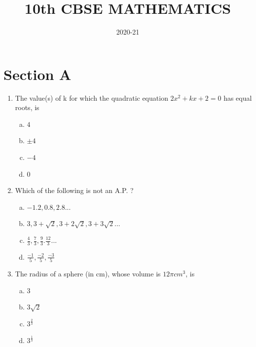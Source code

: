 \documentclass[journal,12pt,twocolumn]{IEEEtran}
\title{10th CBSE MATHEMATICS}
\author{2020-21}
\begin{document}
\maketitle
\newpage
\bigskip
\section{Section A}
\begin{enumerate}[label=1.\arabic*]

\item The value(s) of k for which the quadratic equation $2x^2 + kx + 2 = 0$ has equal roots, is\\
\begin{enumerate}[(a)]
    \item $4$\\
    \item $\pm 4$\\
    \item $- 4$\\
    \item $0$\\
\end{enumerate}

\item Which of the following is not an A.P. ?\\
\begin{enumerate}[(a)]
    \item $-1.2, 0.8, 2.8...$\\
    \item $3, 3 + \sqrt{2}, 3 + 2\sqrt{2},3 + 3\sqrt{2}...$\\ 
    \item $\frac{4}{3}, \frac{7}{3}, \frac{9}{3}. \frac{12}{3}...$\\
    \item $\frac{-1}{5}, \frac{-2}{5}, \frac{-3}{5}$\\
\end{enumerate}

\item The radius of a sphere (in cm), whose volume is $12\pi cm^3$, is\\
\begin{enumerate}[(a)]
    \item $3$\\
    \item $3 \sqrt{2}$\\ 
    \item $3^\frac{2}{3}$\\
    \item $3^\frac{1}{3}$\\
\end{enumerate}


\end{enumerate}
\end{document}

